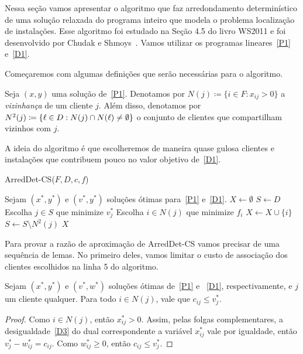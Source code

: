 Nessa seção vamos apresentar o algoritmo que faz arredondamento determinístico de uma solução relaxada do programa inteiro que modela o problema localização de instalações. Esse algoritmo foi estudado na Seção 4.5 do livro WS2011 e foi desenvolvido por Chudak e Shmoys~\cite{Chudak2003}. Vamos utilizar os programas lineares~\eqref{P1} e~\eqref{D1}.

Começaremos com algumas definições que serão necessárias para o algoritmo.
\begin{definition}\label{def:3.7}
    Seja $(x,y)$ uma solução de~\eqref{P1}. Denotamos por ${N(j) \coloneqq \{ i \in F : x_{ij} > 0\}}$ a \emph{vizinhança} de um cliente $j$. Além disso, denotamos por $N^2(j) \coloneqq \{\ell \in D : N(j) \cap N(\ell) \neq \emptyset\}$ o conjunto de clientes que compartilham vizinhos com $j$.
\end{definition}

A ideia do algoritmo é que escolheremos de maneira quase gulosa clientes e instalações que contribuem pouco no valor objetivo de~\eqref{D1}.
\begin{algorithm}[t]
    \caption{\sc ArredDet-CS($F,D,c,f$)}
    \label{fl:plrounding}
    \begin{algorithmic}[1]
        \State Sejam $(x^*,y^*)$ e $(v^*,y^*)$ soluções ótimas para~\eqref{P1} e~\eqref{D1}.
        \State $X \gets \emptyset$
        \State $S \gets D$ 
        \State Escolha $j \in S$ que minimize $v_j^*$
        \State Escolha $i \in N(j)$ que minimize $f_{i}$
        \State $X \gets X \cup \{i\}$
        \State $S \gets S \setminus N^2(j)$
        \EndWhile
        \State \Return $X$
    \end{algorithmic}
\end{algorithm}

Para provar a razão de aproximação de {\sc ArredDet-CS} vamos precisar de uma sequência de lemas. No primeiro deles, vamos limitar o custo de associação dos clientes escolhidos na linha 5 do algoritmo.

\begin{lemma}\label{lemma:3.8}
    Sejam $(x^*,y^*)$ e $(v^*,w^*)$ soluções ótimas de~\eqref{P1} e ~\eqref{D1}, respectivamente, e $j$ um cliente qualquer. Para todo $i \in N(j)$, vale que $c_{ij} \leq v^*_j$.
\end{lemma}
\begin{proof}
    Como $i \in N(j)$, então $x^*_{ij}>0$. Assim, pelas folgas complementares, a desigualdade~\eqref{D3} do dual correspondente a variável $x_{ij}^*$ vale por igualdade, então $v^*_j - w^*_{ij} = c_{ij}$. Como $w^*_{ij} \geq 0$, então $c_{ij} \leq v^*_j$. 
\end{proof}

